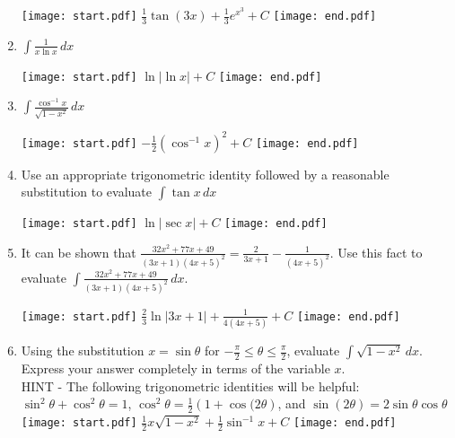 \documentclass[12pt]{article}
\begin{document}
\begin{enumerate}
\texttt{[image: start.pdf]}
{{$\frac{1}{3}\tan{(3x)}+\frac{1}{3}e^{x^3}+C$}}
\texttt{[image: end.pdf]}


\item $\int \frac{1}{x\ln{x}} \,dx$

\texttt{[image: start.pdf]}
{{$\ln{|\ln{x}|}+C$}}
\texttt{[image: end.pdf]}


\item $\int{\frac{\cos^{-1}{x}}{\sqrt{1-x^2}}} \,dx$

\texttt{[image: start.pdf]}
{{$-\frac{1}{2}\left(\cos^{-1}{x}\right)^2+C$}}
\texttt{[image: end.pdf]}


\item Use an appropriate trigonometric identity followed by a reasonable substitution to evaluate $\int \tan{x} \,dx$

\texttt{[image: start.pdf]}
{{$\ln{|\sec{x}|}+C$}}
\texttt{[image: end.pdf]}


\item It can be shown that $\frac{32x^2+77x+49}{(3x+1)(4x+5)^2}=\frac{2}{3x+1}-\frac{1}{(4x+5)^2}$.  Use this fact to evaluate $\int{\frac{32x^2+77x+49}{(3x+1)(4x+5)^2}} \,dx$.

\texttt{[image: start.pdf]}
{{$\frac{2}{3}\ln{|3x+1|}+\frac{1}{4(4x+5)}+C$}}
\texttt{[image: end.pdf]}


\item Using the substitution $x=\sin{\theta}$ for $-\frac{\pi}{2} \leq \theta \leq \frac{\pi}{2}$, evaluate $\int{\sqrt{1-x^2}} \,dx$.  Express your answer completely in terms of the variable $x$.\\

HINT - The following trigonometric identities will be helpful:
$\sin^2{\theta}+\cos^2{\theta}=1$, $\cos^{2}{\theta}=\frac{1}{2}(1+\cos{(2\theta})$, and $\sin{(2\theta)}=2\sin{\theta}\cos{\theta}$\\

\texttt{[image: start.pdf]}
{{$\frac{1}{2}x\sqrt{1-x^2}+\frac{1}{2}\sin^{-1}{x}+C$}}
\texttt{[image: end.pdf]}


\end{enumerate}
\end{document}
